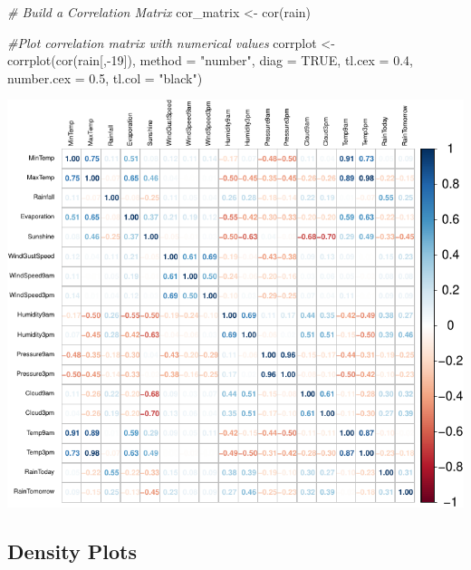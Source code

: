 \documentclass[
]{article}
\newenvironment{Shaded}{\begin{snugshade}}{\end{snugshade}}
\newcommand{\AttributeTok}[1]{\textcolor[rgb]{0.77,0.63,0.00}{#1}}
\newcommand{\CommentTok}[1]{\textcolor[rgb]{0.56,0.35,0.01}{\textit{#1}}}
\newcommand{\ConstantTok}[1]{\textcolor[rgb]{0.00,0.00,0.00}{#1}}
\newcommand{\DecValTok}[1]{\textcolor[rgb]{0.00,0.00,0.81}{#1}}
\newcommand{\FloatTok}[1]{\textcolor[rgb]{0.00,0.00,0.81}{#1}}
\newcommand{\FunctionTok}[1]{\textcolor[rgb]{0.00,0.00,0.00}{#1}}
\newcommand{\NormalTok}[1]{#1}
\newcommand{\OtherTok}[1]{\textcolor[rgb]{0.56,0.35,0.01}{#1}}
\newcommand{\SpecialCharTok}[1]{\textcolor[rgb]{0.00,0.00,0.00}{#1}}
\newcommand{\StringTok}[1]{\textcolor[rgb]{0.31,0.60,0.02}{#1}}
\begin{document}
\begin{Shaded}
\begin{Highlighting}[]
\CommentTok{\# Build a Correlation Matrix}
\NormalTok{cor\_matrix }\OtherTok{\textless{}{-}} \FunctionTok{cor}\NormalTok{(rain)}

\CommentTok{\#Plot correlation matrix with numerical values}
\NormalTok{corrplot }\OtherTok{\textless{}{-}} \FunctionTok{corrplot}\NormalTok{(}\FunctionTok{cor}\NormalTok{(rain[,}\SpecialCharTok{{-}}\DecValTok{19}\NormalTok{]),}
             \AttributeTok{method =} \StringTok{"number"}\NormalTok{,}
             \AttributeTok{diag =} \ConstantTok{TRUE}\NormalTok{,}
             \AttributeTok{tl.cex =} \FloatTok{0.4}\NormalTok{,}
             \AttributeTok{number.cex =} \FloatTok{0.5}\NormalTok{,}
             \AttributeTok{tl.col =} \StringTok{"black"}\NormalTok{)}
\end{Highlighting}
\end{Shaded}

\includegraphics{Rain_Australia_files/figure-latex/correlation-1.pdf}

\hypertarget{density-plots}{%
\subsection{Density Plots}\label{density-plots}}
\end{document}
